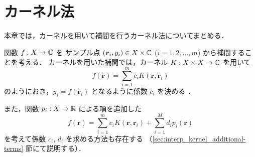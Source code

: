 %

\chapter{カーネル法}

本章では，カーネルを用いて補間を行うカーネル法についてまとめる．

関数 $f : X \to \mathbb{C}$ を
サンプル点 $(\bm{r}_i, y_i) \in X \times \mathbb{C}$ ($i = 1, 2, \ldots, m$) から補間することを考える．
カーネルを用いた補間では，カーネル $K : X \times X \to \mathbb{C}$ を用いて
\begin{equation}
    f(\bm{r}) = \sum_{i=1}^m c_i K(\bm{r}, \bm{r}_i)
\end{equation}
のようにおき，$y_i = f(\bm{r}_i)$ となるように係数 $c_i$ を決める
\cite{Fukumizu2010}．

また，関数 $p_i : X \to \mathbb{R}$ による項を追加した
\begin{equation}
    f(\bm{r}) = \sum_{i=1}^m c_i K(\bm{r}, \bm{r}_i) + \sum_{i=1}^M d_i p_i(\bm{r})
\end{equation}
を考えて係数 $c_i$, $d_i$ を求める方法も存在する
（\ref{sec:interp_kernel_additional-terms} 節にて説明する）．










